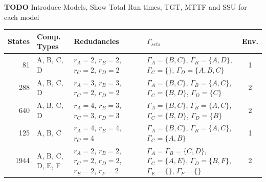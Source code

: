 \documentclass[12pt]{article}
\begin{document}
\textbf{TODO} Introduce Models, Show Total Run times, TGT, MTTF and SSU for each model

\noindent\begin{minipage}[c]{\textwidth}
	\centering
    \begin{tabular}{|r|l|p{3cm}|p{5cm}|c|}
    \hline
	    States & Comp. Types & Redudancies & $\Gamma_{sets}$ & Env. \\ \hline 
	    
	    81 & A, B, C, D & $r_A = 2$, $r_B = 2$, \newline $r_C = 2$, $r_D = 2$ &
	    $\Gamma_{A} = \{B, C\}$, $\Gamma_{B} = \{A, D\}$, \newline $\Gamma_{C} =
	    \{\}$, $\Gamma_{D} = \{A, B, C\}$ & 1 \\ \hline
	    
	    288 & A, B, C, D & $r_A = 3$, $r_B = 3$, \newline $r_C = 2$, $r_D = 2$ &
	    $\Gamma_{A} = \{B, C\}$, $\Gamma_{B} = \{A, C\}$, \newline $\Gamma_{C} =
	    \{B, D\}$, $\Gamma_{D} = \{C\}$ & 2 \\ \hline

	    640 & A, B, C, D & $r_A = 4$, $r_B = 3$, \newline $r_C = 3$, $r_D = 3$ &
	    $\Gamma_{A} = \{B, C\}$, $\Gamma_{B} = \{A, C\}$, \newline $\Gamma_{C} =
	    \{B, D\}$, $\Gamma_{D} = \{B\}$ & 2 \\ \hline
	    
	    125 & A, B, C & $r_A = 4$, $r_B = 4$, \newline $r_C = 4$ & $\Gamma_{A} =
	    \{B, C\}$, $\Gamma_{B} = \{A, C\}$, \newline $\Gamma_{C} = \{A, B\}$ & 1
	    \\ \hline

	    1944 & A, B, C, D, E, F & $r_A = 2$, $r_B = 2$, \newline $r_C = 2$, $r_D
	    = 2$, \newline $r_E = 2$, $r_F = 2$ & $\Gamma_{A} = \Gamma_{B} = \{C,
	    D\} $, \newline $\Gamma_{C} = \{A, E\}$, $\Gamma_{D} = \{B, F\}$,
	    \newline $\Gamma_{E} = \{\}$, $\Gamma_{F} = \{\}$ & 2 \\ \hline

	\end{tabular}
	\label{fig:table}
\end{minipage}
\end{document}
